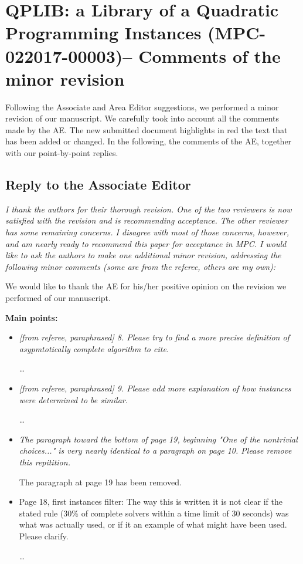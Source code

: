 \documentclass[11pt]{article}
\newcommand{\rep}[1]{{\textcolor{acblue}{#1}}}
\newcommand{\leo}[1]{{\color{red}#1}}
\begin{document}
\section*{QPLIB: a Library of a Quadratic Programming Instances (MPC-022017-00003)-- Comments of the minor revision}

\rep{
 Following the Associate and Area Editor suggestions, we 
 performed a minor revision of our manuscript. We carefully took into account all the comments made by the AE.
 The new submitted document highlights in red the text that has been
added or changed.
In the following, the comments of the AE, together with our point-by-point replies.
}


\subsection*{Reply to the Associate Editor}

{\it
I thank the authors for their thorough revision. One of the two reviewers is now satisfied with the revision and is recommending acceptance. The other reviewer has some remaining concerns. I disagree with most of those concerns, however, and am nearly ready to recommend this paper for acceptance in MPC. I would like to ask the authors to make one additional minor revision, addressing the following minor comments (some are from the referee, others are my own):  
}

\rep{We would like to thank the AE for his/her positive opinion on the revision we performed of our manuscript. 
}

\bigskip
\textbf{Main points:}

\begin{itemize}
\item 
{\it
[from referee, paraphrased] 8. Please try to find a more precise definition of asypmtotically complete algorithm to 
cite.
} 

\rep{\dots}

\item 
{\it
[from referee, paraphrased] 9. Please add more explanation of how instances were determined to be similar. 
}

\rep{\dots}


\item 
{\it
The paragraph toward the bottom of page 19, beginning "One of the nontrivial choices..." is very nearly identical to a paragraph on page 10. Please remove this repitition. 
}

\rep{The paragraph at page 19 has been removed.}


\item Page 18, first instances filter: The way this is written it is not clear if the stated rule (30\% of complete solvers within a time limit of 30 seconds) was what was actually used, or if it an example of what might have been used. Please clarify. 

\rep{\dots}

 
\end{itemize}
\end{document}
